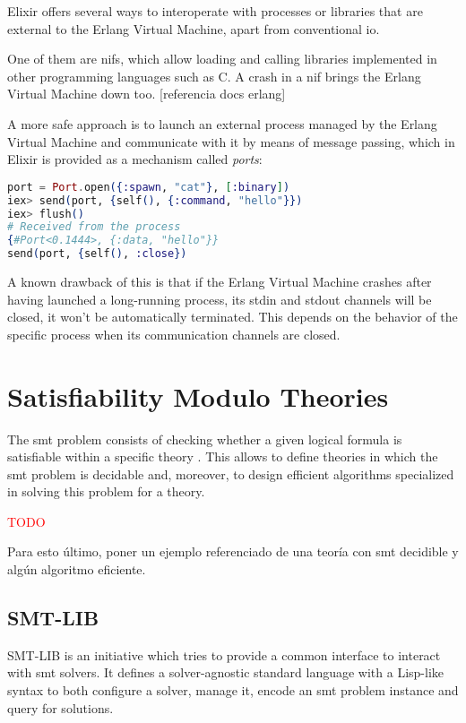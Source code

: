 Elixir offers several ways to interoperate with processes or libraries that are
external to the Erlang Virtual Machine, apart from conventional \gls{io}. 

One of them are \gls{nif}s, which allow loading and calling libraries
implemented in other programming languages such as C. A crash in a \gls{nif}
brings the Erlang Virtual Machine down too. [referencia docs erlang]

A more safe approach is to launch an external process managed by the Erlang
Virtual Machine and communicate with it by means of message passing, which in 
Elixir is provided as a mechanism called \textit{ports}:

\begin{lstlisting}[language=elixir,numbers=none,frame=none]
port = Port.open({:spawn, "cat"}, [:binary])
iex> send(port, {self(), {:command, "hello"}})
iex> flush()
# Received from the process
{#Port<0.1444>, {:data, "hello"}} 
send(port, {self(), :close})
\end{lstlisting}

A known drawback of this is that if the Erlang Virtual Machine crashes after 
having launched a long-running process, its stdin and stdout channels
will be closed, it won't be automatically terminated. This depends on the 
behavior of the specific process when its communication channels are closed.

\section{Satisfiability Modulo Theories}

The \gls{smt} problem consists of checking whether
a given logical formula is satisfiable within a specific theory
\citep{smtLibStandard}. This allows to define theories in which the \gls{smt} problem
is decidable and, moreover, to design efficient algorithms specialized in 
solving this problem for a theory.

\textcolor{red}{TODO}

Para esto último, poner un ejemplo referenciado de una teoría con \gls{smt} decidible y algún 
algoritmo eficiente.

\subsection{SMT-LIB}
\label{prelim:smtlib}

SMT-LIB is an initiative which tries to provide a common interface to interact
with \acrshort{smt} solvers. It defines a solver-agnostic standard language
with a Lisp-like syntax to both configure a solver, manage it, encode an
\gls{smt} problem instance and query for solutions.

